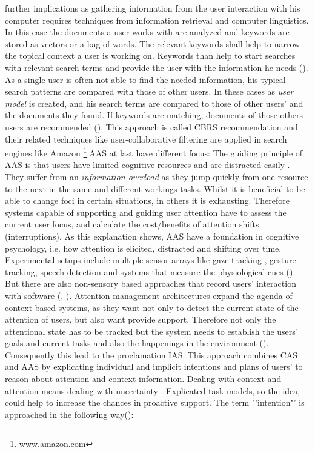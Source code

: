 further implications as gathering information from the user interaction with his computer requires techniques from information retrieval and computer linguistics. In this case the documents a user works with are analyzed and keywords are stored as vectors or a bag of words. The relevant keywords shall help to narrow the topical context a user is working on. Keywords than help to start searches with relevant search terms and provide the user with the information he needs (\cite{budzik2000user}).  As a single user is often not able to find the needed information, his typical search patterns are compared with those of other users. In these cases as \textit{user model} is created, and his search terms are compared to those of other users' and the documents they found. If keywords are matching, documents of those others users are recommended (\cite{anand2007contextual}). This approach is called \ac{CBRS} recommendation and their related techniques like user-collaborative filtering are applied in search engines like Amazon \footnote{www.amazon.com}.\ac{AAS} at last have different focus: The guiding principle of \acs{AAS} is that users have limited cognitive resources and are distracted easily . They suffer from an \textit{information overload} as they jump quickly from one resource to the next in the same and different workings tasks. Whilst it is beneficial to be able to change foci in certain situations, in others it is exhausting. Therefore systems capable of supporting and guiding user attention have to assess the current user focus, and calculate the cost/benefits of attention shifts (interruptions). As this explanation shows, \acs{AAS} have a foundation in cognitive psychology, i.e. how attention is elicited, distracted and shifting over time. Experimental setups include multiple sensor arrays like  gaze-tracking-, gesture-tracking, speech-detection and systems that measure the physiological cues (\cite{roda2006attention}). But there are also non-sensory based approaches that record users' interaction with software (\cite{horvitz2003models}, \cite{schmitz2011contextualized}). Attention management architectures expand the agenda of context-based systems, as they want not only to detect the current state of the attention of users, but also want provide support. Therefore not only the attentional state has to be tracked but the system needs to establish the users' goals and current tasks and also the happenings in the environment (\cite{roda2006attention}). Consequently this lead to the proclamation \ac{IAS}. This approach combines \acs{CAS} and \acs{AAS} by explicating individual and implicit intentions and plans of users' to reason about attention and context information. Dealing with context and attention means dealing with uncertainty . Explicated task models, so the idea, could help to increase the chances in proactive support. The term "'intention"' is  approached in the following way(\cite{cohen1990intention}):
